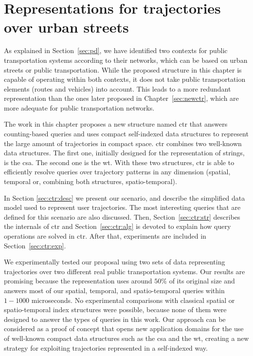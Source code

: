 \chapter{Representations for trajectories over urban streets}
\label{sec:ctr}
	As explained in Section~\ref{sec:pd}, we have identified two contexts for public transportation systems according to their networks, which can be based on urban streets or public transportation. While the proposed structure in this chapter is capable of operating within both contexts, it does not take public transportation elements (routes and vehicles) into account. This leads to a more redundant representation than the ones later proposed in Chapter~\ref{sec:newctr}, which are more adequate for public transportation networks.
	
	The work in this chapter proposes a new structure named \acrfull{ctr} that answers  counting-based queries and uses compact self-indexed data structures to represent the large amount of trajectories in compact space.
	\gls{ctr} combines two well-known data structures. The first one,
	initially designed for the representation of strings, is the
	\gls{csa}. The second
	one is the \gls{wt}. With these two structures, \gls{ctr} is able to efficiently resolve queries over trajectory patterns in any dimension (spatial, temporal or, combining both structures, spatio-temporal).

    In Section \ref{sec:ctr:desc} we present our scenario, and describe the simplified data model used to represent user trajectories. The most interesting queries that are defined for this scenario are also discussed. Then, Section~\ref{sec:ctr:str} describes the internals of \gls{ctr} and Section~\ref{sec:ctr:alg} is devoted to explain how query operations are solved in \gls{ctr}. After that, experiments are included in Section~\ref{sec:ctr:exp}.

	We experimentally tested our proposal using two sets of %
	data representing trajectories over two different real public
	transportation systems. Our results are promising because the
	representation uses around  $50$\% of its original size and
	answers most of our spatial, temporal,  and spatio-temporal queries within $1\!-\!1000$ microseconds. 
	No experimental comparisons with classical spatial or spatio-temporal
	index structures were possible, because none of them were designed to
	answer the types of queries in this work. Our approach can  be
	considered as a proof of concept that opens new application
	domains for the use of well-known compact data structures such as the
	\gls{csa} and the \gls{wt}, creating a new strategy for
	exploiting trajectories represented in a self-indexed way.

